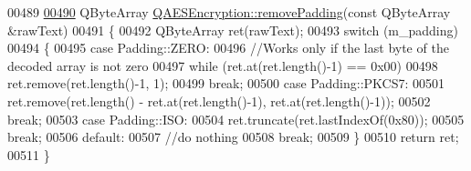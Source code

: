 \begin{DoxyCode}
00489 
\mbox{\hyperlink{class_q_a_e_s_encryption_a4dc7e77485e5a3e63eebc99b9386c17b}{00490}} QByteArray \mbox{\hyperlink{class_q_a_e_s_encryption_a4dc7e77485e5a3e63eebc99b9386c17b}{QAESEncryption::removePadding}}(\textcolor{keyword}{const} QByteArray &rawText)
00491 \{
00492     QByteArray ret(rawText);
00493     \textcolor{keywordflow}{switch} (m\_padding)
00494     \{
00495     \textcolor{keywordflow}{case} Padding::ZERO:
00496         \textcolor{comment}{//Works only if the last byte of the decoded array is not zero}
00497         \textcolor{keywordflow}{while} (ret.at(ret.length()-1) == 0x00)
00498             ret.remove(ret.length()-1, 1);
00499         \textcolor{keywordflow}{break};
00500     \textcolor{keywordflow}{case} Padding::PKCS7:
00501         ret.remove(ret.length() - ret.at(ret.length()-1), ret.at(ret.length()-1));
00502         \textcolor{keywordflow}{break};
00503     \textcolor{keywordflow}{case} Padding::ISO:
00504         ret.truncate(ret.lastIndexOf(0x80));
00505         \textcolor{keywordflow}{break};
00506     \textcolor{keywordflow}{default}:
00507         \textcolor{comment}{//do nothing}
00508         \textcolor{keywordflow}{break};
00509     \}
00510     \textcolor{keywordflow}{return} ret;
00511 \}
\end{DoxyCode}
